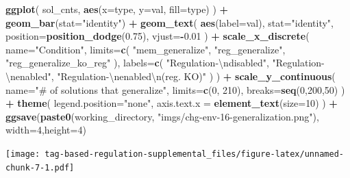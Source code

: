 \documentclass[
]{book}
\newenvironment{Shaded}{\begin{snugshade}}{\end{snugshade}}
\newcommand{\CharTok}[1]{\textcolor[rgb]{0.31,0.60,0.02}{#1}}
\newcommand{\DataTypeTok}[1]{\textcolor[rgb]{0.13,0.29,0.53}{#1}}
\newcommand{\DecValTok}[1]{\textcolor[rgb]{0.00,0.00,0.81}{#1}}
\newcommand{\FloatTok}[1]{\textcolor[rgb]{0.00,0.00,0.81}{#1}}
\newcommand{\KeywordTok}[1]{\textcolor[rgb]{0.13,0.29,0.53}{\textbf{#1}}}
\newcommand{\NormalTok}[1]{#1}
\newcommand{\OperatorTok}[1]{\textcolor[rgb]{0.81,0.36,0.00}{\textbf{#1}}}
\newcommand{\StringTok}[1]{\textcolor[rgb]{0.31,0.60,0.02}{#1}}
\begin{document}
\begin{Shaded}
\begin{Highlighting}[]
\KeywordTok{ggplot}\NormalTok{( sol\_cnts, }\KeywordTok{aes}\NormalTok{(}\DataTypeTok{x=}\NormalTok{type, }\DataTypeTok{y=}\NormalTok{val, }\DataTypeTok{fill=}\NormalTok{type) ) }\OperatorTok{+}
\StringTok{  }\KeywordTok{geom\_bar}\NormalTok{(}\DataTypeTok{stat=}\StringTok{"identity"}\NormalTok{) }\OperatorTok{+}
\StringTok{  }\KeywordTok{geom\_text}\NormalTok{(}
    \KeywordTok{aes}\NormalTok{(}\DataTypeTok{label=}\NormalTok{val),}
    \DataTypeTok{stat=}\StringTok{"identity"}\NormalTok{,}
    \DataTypeTok{position=}\KeywordTok{position\_dodge}\NormalTok{(}\FloatTok{0.75}\NormalTok{),}
    \DataTypeTok{vjust=}\OperatorTok{{-}}\FloatTok{0.01}
\NormalTok{  ) }\OperatorTok{+}
\StringTok{  }\KeywordTok{scale\_x\_discrete}\NormalTok{(}
    \DataTypeTok{name=}\StringTok{"Condition"}\NormalTok{,}
    \DataTypeTok{limits=}\KeywordTok{c}\NormalTok{(}
      \StringTok{"mem\_generalize"}\NormalTok{,}
      \StringTok{"reg\_generalize"}\NormalTok{,}
      \StringTok{"reg\_generalize\_ko\_reg"}
\NormalTok{      ),}
    \DataTypeTok{labels=}\KeywordTok{c}\NormalTok{(}
      \StringTok{"Regulation{-}}\CharTok{\textbackslash{}n}\StringTok{disabled"}\NormalTok{,}
      \StringTok{"Regulation{-}}\CharTok{\textbackslash{}n}\StringTok{enabled"}\NormalTok{,}
      \StringTok{"Regulation{-}}\CharTok{\textbackslash{}n}\StringTok{enabled}\CharTok{\textbackslash{}n}\StringTok{(reg. KO)"}
\NormalTok{    )}
\NormalTok{  ) }\OperatorTok{+}
\StringTok{  }\KeywordTok{scale\_y\_continuous}\NormalTok{(}
    \DataTypeTok{name=}\StringTok{"\# of solutions that generalize"}\NormalTok{,}
    \DataTypeTok{limits=}\KeywordTok{c}\NormalTok{(}\DecValTok{0}\NormalTok{, }\DecValTok{210}\NormalTok{),}
    \DataTypeTok{breaks=}\KeywordTok{seq}\NormalTok{(}\DecValTok{0}\NormalTok{,}\DecValTok{200}\NormalTok{,}\DecValTok{50}\NormalTok{)}
\NormalTok{  ) }\OperatorTok{+}
\StringTok{  }\KeywordTok{theme}\NormalTok{(}
    \DataTypeTok{legend.position=}\StringTok{"none"}\NormalTok{,}
    \DataTypeTok{axis.text.x =} \KeywordTok{element\_text}\NormalTok{(}\DataTypeTok{size=}\DecValTok{10}\NormalTok{)}
\NormalTok{  ) }\OperatorTok{+}
\StringTok{  }\KeywordTok{ggsave}\NormalTok{(}\KeywordTok{paste0}\NormalTok{(working\_directory, }\StringTok{"imgs/chg{-}env{-}16{-}generalization.png"}\NormalTok{), }\DataTypeTok{width=}\DecValTok{4}\NormalTok{,}\DataTypeTok{height=}\DecValTok{4}\NormalTok{)}
\end{Highlighting}
\end{Shaded}

\texttt{[image: tag-based-regulation-supplemental\_files/figure-latex/unnamed-chunk-7-1.pdf]}
\end{document}
